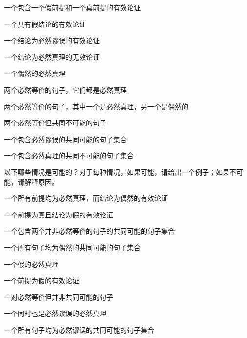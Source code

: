 \begin{compactlist}
\item 一个包含一个假前提和一个真前提的有效论证

\item 一个具有假结论的有效论证

\item 一个结论为必然谬误的有效论证

\item 一个结论为必然真理的无效论证

\item 一个偶然的必然真理

\item 两个必然等价的句子，它们都是必然真理

\item 两个必然等价的句子，其中一个是必然真理，另一个是偶然的

\item 两个必然等价但共同不可能的句子

\item 一个包含必然谬误的共同可能的句子集合

\item 一个包含必然真理的共同不可能的句子集合
\end{compactlist}

\problempart
以下哪些情况是可能的？对于每种情况，如果可能，请给出一个例子；如果不可能，请解释原因。

\begin{compactlist}
\item 一个所有前提均为必然真理，而结论为偶然的有效论证
\item 一个前提为真且结论为假的有效论证
\item 一个包含两个并非必然等价的句子的共同可能的句子集合
\item 一个所有句子均为偶然的共同可能的句子集合
\item 一个假的必然真理
\item 一个前提为假的有效论证
\item 一对必然等价但并非共同可能的句子
\item 一个同时也是必然谬误的必然真理
\item 一个所有句子均为必然谬误的共同可能的句子集合
\end{compactlist}